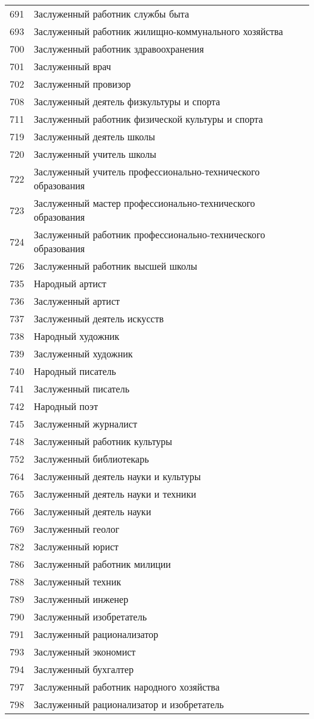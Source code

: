 \documentclass[10pt, a4paper, titlepage]{article}
\begin{document}
\begin{xtabular}{rp{.38\textwidth}}
    691 & Заслуженный работник службы быта \\
    693 & Заслуженный работник жилищно-коммунального хозяйства \\
    700 & Заслуженный работник здравоохранения \\
    701 & Заслуженный врач \\
    702 & Заслуженный провизор \\
    708 & Заслуженный деятель физкультуры и спорта \\
    711 & Заслуженный работник физической культуры и спорта \\
    719 & Заслуженный деятель школы \\
    720 & Заслуженный учитель школы \\
    722 & Заслуженный учитель профессионально-технического образования \\
    723 & Заслуженный мастер профессионально-технического образования \\
    724 & Заслуженный работник профессионально-технического образования \\
    726 & Заслуженный работник высшей школы \\
    735 & Народный артист \\
    736 & Заслуженный артист \\
    737 & Заслуженный деятель искусств \\
    738 & Народный художник \\
    739 & Заслуженный художник \\
    740 & Народный писатель \\
    741 & Заслуженный писатель \\
    742 & Народный поэт \\
    745 & Заслуженный журналист \\
    748 & Заслуженный работник культуры \\
    752 & Заслуженный библиотекарь \\
    764 & Заслуженный деятель науки и культуры \\
    765 & Заслуженный деятель науки и техники \\
    766 & Заслуженный деятель науки \\
    769 & Заслуженный геолог \\
    782 & Заслуженный юрист \\
    786 & Заслуженный работник милиции \\
    788 & Заслуженный техник \\
    789 & Заслуженный инженер \\
    790 & Заслуженный изобретатель \\
    791 & Заслуженный рационализатор \\
    793 & Заслуженный экономист \\
    794 & Заслуженный бухгалтер \\
    797 & Заслуженный работник народного хозяйства \\
    798 & Заслуженный рационализатор и изобретатель \\
\end{xtabular}
\onecolumn
\end{document}

